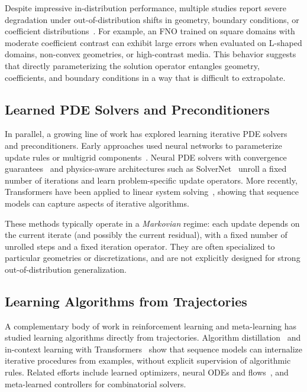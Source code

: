 \documentclass{article}
\begin{document}
Despite impressive in-distribution performance, multiple studies report severe degradation under out-of-distribution shifts in geometry, boundary conditions, or coefficient distributions~\cite{kovachki2021neuraloperators,lu2022comprehensive}. For example, an FNO trained on square domains with moderate coefficient contrast can exhibit large errors when evaluated on L-shaped domains, non-convex geometries, or high-contrast media. This behavior suggests that directly parameterizing the solution operator entangles geometry, coefficients, and boundary conditions in a way that is difficult to extrapolate.

\subsection{Learned PDE Solvers and Preconditioners}

In parallel, a growing line of work has explored learning iterative PDE solvers and preconditioners. Early approaches used neural networks to parameterize update rules or multigrid components~\cite{haber2017learning,bar2021learning}. Neural PDE solvers with convergence guarantees~\cite{li2020neuralpde} and physics-aware architectures such as SolverNet~\cite{wight2022solvernet} unroll a fixed number of iterations and learn problem-specific update operators. More recently, Transformers have been applied to linear system solving~\cite{hoyer2023learning}, showing that sequence models can capture aspects of iterative algorithms.

These methods typically operate in a \emph{Markovian} regime: each update depends on the current iterate (and possibly the current residual), with a fixed number of unrolled steps and a fixed iteration operator. They are often specialized to particular geometries or discretizations, and are not explicitly designed for strong out-of-distribution generalization.

\subsection{Learning Algorithms from Trajectories}

A complementary body of work in reinforcement learning and meta-learning has studied learning algorithms directly from trajectories. Algorithm distillation~\cite{agarwal2023algorithmic} and in-context learning with Transformers~\cite{vonOswald2023transformers,garg2022can} show that sequence models can internalize iterative procedures from examples, without explicit supervision of algorithmic rules. Related efforts include learned optimizers, neural ODEs and flows~\cite{chen2018neuralode}, and meta-learned controllers for combinatorial solvers.
\end{document}
